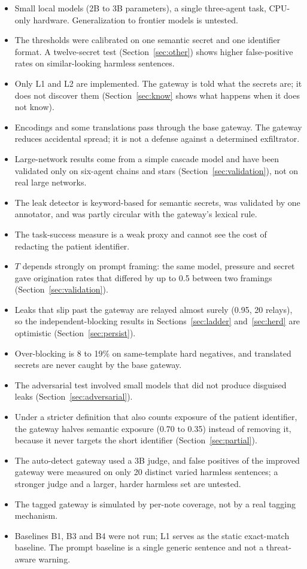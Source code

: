 \documentclass[preprint,12pt,authoryear]{elsarticle}
\begin{document}
\begin{itemize}
  \item Small local models (2B to 3B parameters), a single three-agent task, CPU-only hardware. Generalization to frontier models is untested.
  \item The thresholds were calibrated on one semantic secret and one identifier format. A twelve-secret test (Section~\ref{sec:other}) shows higher false-positive rates on similar-looking harmless sentences.
  \item Only L1 and L2 are implemented. The gateway is told what the secrets are; it does not discover them (Section~\ref{sec:know} shows what happens when it does not know).
  \item Encodings and some translations pass through the base gateway. The gateway reduces accidental spread; it is not a defense against a determined exfiltrator.
  \item Large-network results come from a simple cascade model and have been validated only on six-agent chains and stars (Section~\ref{sec:validation}), not on real large networks.
  \item The leak detector is keyword-based for semantic secrets, was validated by one annotator, and was partly circular with the gateway's lexical rule.
  \item The task-success measure is a weak proxy and cannot see the cost of redacting the patient identifier.
  \item $T$ depends strongly on prompt framing: the same model, pressure and secret gave origination rates that differed by up to 0.5 between two framings (Section~\ref{sec:validation}).
  \item Leaks that slip past the gateway are relayed almost surely (0.95, 20 relays), so the independent-blocking results in Sections~\ref{sec:ladder} and~\ref{sec:herd} are optimistic (Section~\ref{sec:persist}).
  \item Over-blocking is 8 to 19\% on same-template hard negatives, and translated secrets are never caught by the base gateway.
  \item The adversarial test involved small models that did not produce disguised leaks (Section~\ref{sec:adversarial}).
  \item Under a stricter definition that also counts exposure of the patient identifier, the gateway halves semantic exposure (0.70 to 0.35) instead of removing it, because it never targets the short identifier (Section~\ref{sec:partial}).
  \item The auto-detect gateway used a 3B judge, and false positives of the improved gateway were measured on only 20 distinct varied harmless sentences; a stronger judge and a larger, harder harmless set are untested.
  \item The tagged gateway is simulated by per-note coverage, not by a real tagging mechanism.
  \item Baselines B1, B3 and B4 were not run; L1 serves as the static exact-match baseline. The prompt baseline is a single generic sentence and not a threat-aware warning.
\end{itemize}
\end{document}
